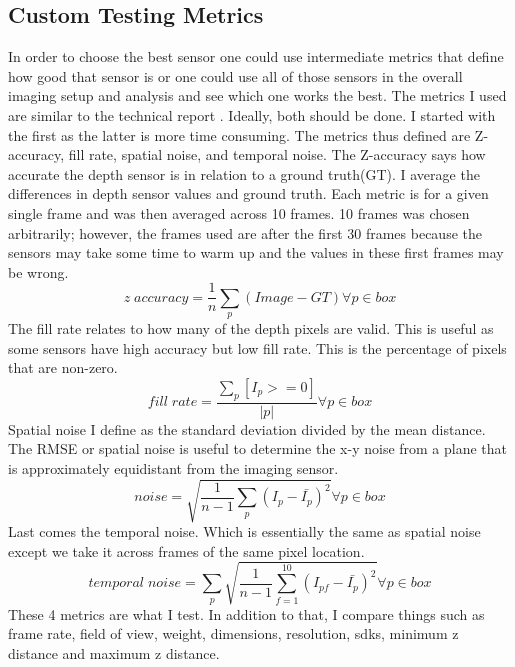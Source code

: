 \subsection{Custom Testing Metrics}

In order to choose the best sensor one could use intermediate metrics that define how good that sensor is or one could use all of those sensors in the overall imaging setup and analysis and see which one works the best. The metrics I used are similar to the technical report \cite{depthtesting}. Ideally, both should be done. I started with the first as the latter is more time consuming. The metrics thus defined are Z-accuracy, fill rate, spatial noise, and temporal noise. The Z-accuracy says how accurate the depth sensor is in relation to a ground truth(GT). I average the differences in depth sensor values and ground truth. Each metric is for a given single frame and was then averaged across 10 frames. 10 frames was chosen arbitrarily; however, the frames used are after the first 30 frames because the sensors may take some time to warm up and the values in these first frames may be wrong.
\begin{equation}
	z \; accuracy = \frac{1}{n}\sum_p(Image - GT) \forall p \in box
\end{equation}
The fill rate relates to how many of the depth pixels are valid. This is useful as some sensors have high accuracy but low fill rate. This is the percentage of pixels that are non-zero.
\begin{equation}
	fill \; rate = \frac{\sum_p[I_p >= 0]}{\vert p \vert} \forall p \in box
\end{equation}
Spatial noise I define as the standard deviation divided by the mean distance.
The RMSE or spatial noise is useful to determine the x-y noise from a plane that is approximately equidistant from the imaging sensor.
\begin{equation}
	noise = \sqrt{\frac{1}{n-1}\sum_p(I_p-{\bar{I_p}})^2} \forall p \in box
\end{equation}
Last comes the temporal noise. Which is essentially the same as spatial noise except we take it across frames of the same pixel location.
\begin{equation}
	temporal \; noise = \sum_p\sqrt{\frac{1}{n-1}\sum_{f=1}^{10}(I_{pf}-\bar{I_p})^2} \forall p \in box
\end{equation}
These 4 metrics are what I test. In addition to that, I compare things such as frame rate, field of view, weight, dimensions, resolution, sdks, minimum z distance and maximum z distance.

